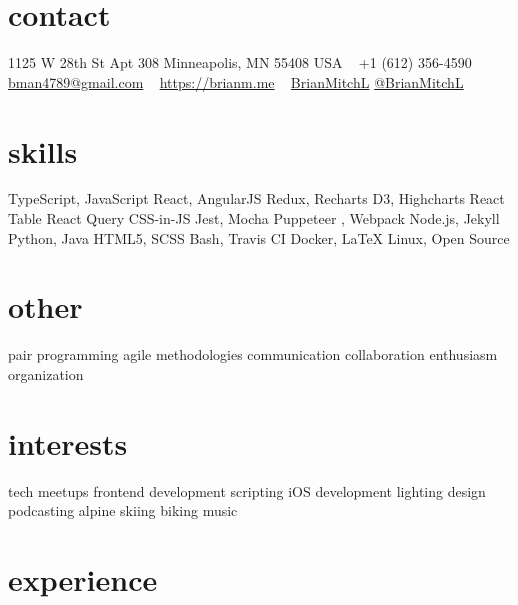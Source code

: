 \documentclass[]{cv-style} %
\begin{document}
\lastupdated


\begin{aside} %
\section{contact}
\small{1125 W 28th St
Apt 308
Minneapolis, MN 55408
USA}
~
+1 (612) 356-4590
~
\href{mailto:bman4789@gmail.com}{bman4789@gmail.com}
~
\href{https://brianm.me}{https://brianm.me}
~
\href{https://github.com/BrianMitchL}{\textcolor{darkgray}{ }BrianMitchL}
\href{https://twitter.com/BrianMitchL}{\textcolor{twitter}{ }@BrianMitchL}
\section{skills}
TypeScript, JavaScript
React, AngularJS
Redux, Recharts
D3, Highcharts
React Table
React Query
CSS-in-JS
Jest, Mocha
Puppeteer
, Webpack
Node.js, Jekyll
Python, Java
HTML5, SCSS
Bash, Travis CI
Docker, \LaTeX
Linux, Open Source
\section{other}
pair programming
agile methodologies
communication
collaboration
enthusiasm
organization
\section{interests}
tech meetups
frontend development
scripting
iOS development
lighting design
podcasting
alpine skiing
biking
music
\end{aside}



\section{experience}

%
%
%
%
\end{document}
